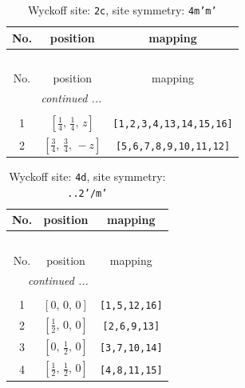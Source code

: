 \documentclass[fleqn,8pt]{jsarticle}
\begin{document}
\renewcommand{\arraystretch}{1.2}
\begin{longtable}{ccc}
\caption{Wyckoff site: {\tt 2c}, site symmetry: {\tt 4m'm'}}
 \\
 \hline \hline
No. & position & mapping \\ \hline \endfirsthead

\multicolumn{2}{l}{\tablename\ \thetable{}} \\
 \hline \hline
No. & position & mapping \\ \hline \endhead

 \hline \hline
\multicolumn{2}{r}{\footnotesize\it continued ...} \\ \endfoot

 \hline \hline
\multicolumn{2}{r}{} \\ \endlastfoot

1 & $\left[ \frac{1}{4},\, \frac{1}{4},\, z \right]$ & {\tt [1,2,3,4,13,14,15,16]} \\ \hline
2 & $\left[ \frac{3}{4},\, \frac{3}{4},\, - z \right]$ & {\tt [5,6,7,8,9,10,11,12]} \\
\end{longtable}
\renewcommand{\arraystretch}{1.2}
\begin{longtable}{ccc}
\caption{Wyckoff site: {\tt 4d}, site symmetry: {\tt ..2'/m'}}
 \\
 \hline \hline
No. & position & mapping \\ \hline \endfirsthead

\multicolumn{2}{l}{\tablename\ \thetable{}} \\
 \hline \hline
No. & position & mapping \\ \hline \endhead

 \hline \hline
\multicolumn{2}{r}{\footnotesize\it continued ...} \\ \endfoot

 \hline \hline
\multicolumn{2}{r}{} \\ \endlastfoot

1 & $\left[ 0,\, 0,\, 0 \right]$ & {\tt [1,5,12,16]} \\ \hline
2 & $\left[ \frac{1}{2},\, 0,\, 0 \right]$ & {\tt [2,6,9,13]} \\ \hline
3 & $\left[ 0,\, \frac{1}{2},\, 0 \right]$ & {\tt [3,7,10,14]} \\ \hline
4 & $\left[ \frac{1}{2},\, \frac{1}{2},\, 0 \right]$ & {\tt [4,8,11,15]} \\
\end{longtable}
\renewcommand{\arraystretch}{1.2}
\end{document}
